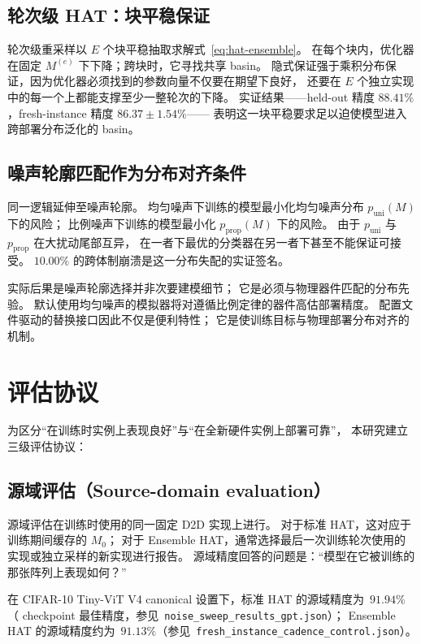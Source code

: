 \subsection{轮次级 HAT：块平稳保证}

轮次级重采样以 $E$ 个块平稳抽取求解式~\ref{eq:hat-ensemble}。
在每个块内，优化器在固定 $M^{(e)}$ 下下降；跨块时，它寻找共享 basin。
隐式保证强于乘积分布保证，因为优化器必须找到的参数向量不仅要在期望下良好，
还要在 $E$ 个独立实现中的每一个上都能支撑至少一整轮次的下降。
实证结果——held-out 精度 $88.41\%$，fresh-instance 精度 $86.37\pm1.54\%$——
表明这一块平稳要求足以迫使模型进入跨部署分布泛化的 basin。

\subsection{噪声轮廓匹配作为分布对齐条件}

同一逻辑延伸至噪声轮廓。
均匀噪声下训练的模型最小化均匀噪声分布 $p_{\mathrm{uni}}(M)$ 下的风险；
比例噪声下训练的模型最小化 $p_{\mathrm{prop}}(M)$ 下的风险。
由于 $p_{\mathrm{uni}}$ 与 $p_{\mathrm{prop}}$ 在大扰动尾部互异，
在一者下最优的分类器在另一者下甚至不能保证可接受。
$10.00\%$ 的跨体制崩溃是这一分布失配的实证签名。

实际后果是噪声轮廓选择并非次要建模细节；
它是必须与物理器件匹配的分布先验。
默认使用均匀噪声的模拟器将对遵循比例定律的器件高估部署精度。
配置文件驱动的替换接口因此不仅是便利特性；
它是使训练目标与物理部署分布对齐的机制。

\section{评估协议}
\label{sec:eval-protocols}

为区分``在训练时实例上表现良好''与``在全新硬件实例上部署可靠''，
本研究建立三级评估协议：

\subsection{源域评估（Source-domain evaluation）}

源域评估在训练时使用的同一固定 D2D 实现上进行。
对于标准 HAT，这对应于训练期间缓存的 $M_0$；
对于 Ensemble HAT，通常选择最后一次训练轮次使用的实现或独立采样的新实现进行报告。
源域精度回答的问题是：``模型在它被训练的那张阵列上表现如何？''

在 CIFAR-10 Tiny-ViT V4 canonical 设置下，标准 HAT 的源域精度为~$91.94\%$
（ checkpoint 最佳精度，参见~\texttt{noise\_sweep\_results\_gpt.json}）；
Ensemble HAT 的源域精度约为~$91.13\%$（参见~\texttt{fresh\_instance\_cadence\_control.json}）。

